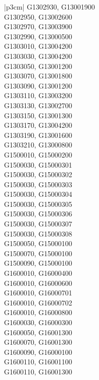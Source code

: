 \begin{customLongTable}{ |p{3cm}| }
G1302930, G13001900 \\ \hline
G1302950, G13002600 \\ \hline
G1302970, G13003900 \\ \hline
G1302990, G13000500 \\ \hline
G1303010, G13004200 \\ \hline
G1303030, G13004200 \\ \hline
G1303050, G13001200 \\ \hline
G1303070, G13001800 \\ \hline
G1303090, G13001200 \\ \hline
G1303110, G13003200 \\ \hline
G1303130, G13002700 \\ \hline
G1303150, G13001300 \\ \hline
G1303170, G13004200 \\ \hline
G1303190, G13001600 \\ \hline
G1303210, G13000800 \\ \hline
G1500010, G15000200 \\ \hline
G1500030, G15000301 \\ \hline
G1500030, G15000302 \\ \hline
G1500030, G15000303 \\ \hline
G1500030, G15000304 \\ \hline
G1500030, G15000305 \\ \hline
G1500030, G15000306 \\ \hline
G1500030, G15000307 \\ \hline
G1500030, G15000308 \\ \hline
G1500050, G15000100 \\ \hline
G1500070, G15000100 \\ \hline
G1500090, G15000100 \\ \hline
G1600010, G16000400 \\ \hline
G1600010, G16000600 \\ \hline
G1600010, G16000701 \\ \hline
G1600010, G16000702 \\ \hline
G1600010, G16000800 \\ \hline
G1600030, G16000300 \\ \hline
G1600050, G16001300 \\ \hline
G1600070, G16001300 \\ \hline
G1600090, G16000100 \\ \hline
G1600110, G16001100 \\ \hline
G1600110, G16001300 \\ \hline

\end{customLongTable}
